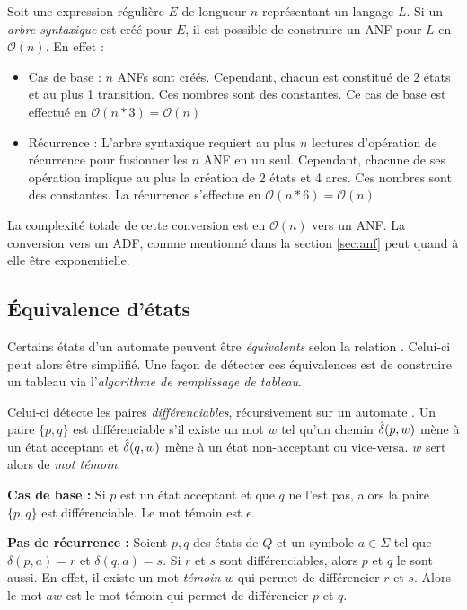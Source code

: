 \begin{complexity}
	Soit une expression régulière $E$ de longueur $n$ représentant un langage $L$. Si un \emph{arbre syntaxique} est créé pour $E$, il est possible de construire un ANF pour $L$ en $\mathcal{O}(n)$. En effet :
	\begin{itemize}
		\item Cas de base : $n$ ANFs sont créés. Cependant, chacun est constitué de 2 états et au plus 1 transition. Ces nombres sont des constantes. Ce cas de base est effectué en $\mathcal{O}(n*3)=\mathcal{O}(n)$
		\item Récurrence : L'arbre syntaxique requiert au plus $n$ lectures d'opération de récurrence pour fusionner les $n$ ANF en un seul. Cependant, chacune de ses opération implique au plus la création de 2 états et 4 arcs. Ces nombres sont des constantes. La récurrence s'effectue en $\mathcal{O}(n*6)=\mathcal{O}(n)$
	\end{itemize}
	
	La complexité totale de cette conversion est en $\mathcal{O}(n)$ vers un ANF. La conversion vers un ADF, comme mentionné dans la section \ref{sec:anf} peut quand à elle être exponentielle. 
	
\end{complexity}


\subsection{Équivalence d'états}\label{ss:tfa}
	 
	 Certains états d'un automate peuvent être \emph{équivalents} selon la relation \rm. Celui-ci peut alors être simplifié. Une façon de détecter ces équivalences est de construire un tableau via l'\emph{algorithme de remplissage de tableau}.
	 
	 Celui-ci détecte les paires \emph{différenciables}, récursivement sur un automate \automaton. Un paire $\{p,q\}$ est différenciable s'il existe un mot $w$ tel qu'un chemin $\hat{\delta}(p,w)$ mène à un état acceptant et $\hat{\delta}(q,w)$ mène à un état non-acceptant ou vice-versa. $w$ sert alors de \emph{mot témoin}.
	 
	 
	 \textbf{Cas de base :} Si $p$ est un état acceptant et que $q$ ne l'est pas, alors la paire $\{p,q\}$ est différenciable. Le mot témoin est $\epsilon$.
	 
	 \textbf{Pas de récurrence : } Soient $p,q$ des états de $Q$ et un symbole $a \in \Sigma$ tel que $\delta(p,a)=r$ et $\delta(q,a)=s$. Si $r$ et $s$ sont différenciables, alors $p$ et $q$ le sont aussi. En effet, il existe un mot \emph{témoin} $w$ qui permet de différencier $r$ et $s$. Alors le mot $aw$ est le mot témoin qui permet de différencier $p$ et $q$.
	 
